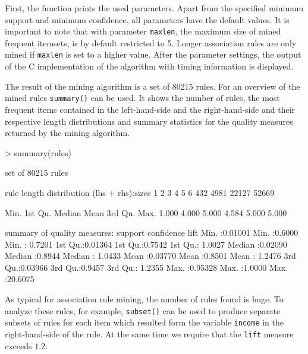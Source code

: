 \documentclass[10pt,a4paper]{article}
\newcommand{\func}[1]{\mbox{\texttt{#1()}}}
\newcommand{\code}[1]{\mbox{\texttt{#1}}}
\newcommand{\proglang}[1]{\textsf{#1}}
\begin{document}
%

First, the function prints the used parameters.  Apart from the
specified minimum support and minimum confidence, all parameters have
the default values. It is important to note that with parameter
\code{maxlen}, the maximum size of mined frequent itemsets, is by
default restricted to 5.  Longer association rules are only mined if
\code{maxlen} is set to a higher value.  After the parameter settings,
the output of the \proglang{C} implementation of the algorithm with timing
information is displayed.

The result of the mining algorithm is a set of 80215
rules.  For an overview of the mined rules \func{summary}
can be used.   It shows the number of rules, the most frequent items
contained in the left-hand-side and the right-hand-side and their
respective length distributions and summary statistics for the quality
measures returned by the mining algorithm.

\begin{Schunk}
\begin{Sinput}
> summary(rules)
\end{Sinput}
\begin{Soutput}
set of 80215 rules

rule length distribution (lhs + rhs):sizes
    1     2     3     4     5 
    6   432  4981 22127 52669 

   Min. 1st Qu.  Median    Mean 3rd Qu.    Max. 
  1.000   4.000   5.000   4.584   5.000   5.000 

summary of quality measures:
    support          confidence          lift        
 Min.   :0.01001   Min.   :0.6000   Min.   : 0.7201  
 1st Qu.:0.01364   1st Qu.:0.7542   1st Qu.: 1.0027  
 Median :0.02090   Median :0.8944   Median : 1.0433  
 Mean   :0.03770   Mean   :0.8501   Mean   : 1.2476  
 3rd Qu.:0.03966   3rd Qu.:0.9457   3rd Qu.: 1.2355  
 Max.   :0.95328   Max.   :1.0000   Max.   :20.6075  
\end{Soutput}
\end{Schunk}

As typical for association rule mining, the number of rules found is
huge.  To analyze these rules, for example, \func{subset} can be used to
produce separate subsets of rules for each item which resulted form the
variable \code{income} in the right-hand-side of the rule. At the same
time we require that the \code{lift} measure exceeds $1.2$.
\end{document}
